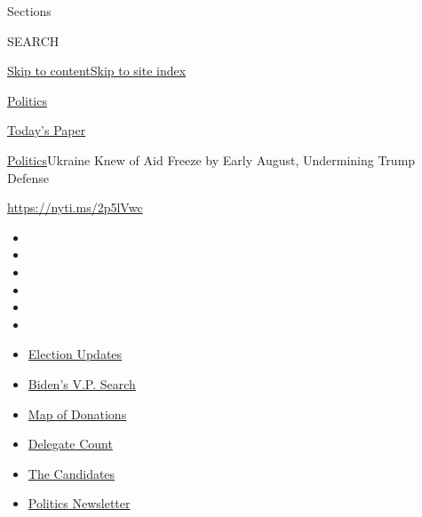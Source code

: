 Sections

SEARCH

\protect\hyperlink{site-content}{Skip to
content}\protect\hyperlink{site-index}{Skip to site index}

\href{https://www.nytimes.com/section/politics}{Politics}

\href{https://myaccount.nytimes.com/auth/login?response_type=cookie\&client_id=vi}{}

\href{https://www.nytimes.com/section/todayspaper}{Today's Paper}

\href{/section/politics}{Politics}\textbar{}Ukraine Knew of Aid Freeze
by Early August, Undermining Trump Defense

\url{https://nyti.ms/2p5lVwc}

\begin{itemize}
\item
\item
\item
\item
\item
\item
\end{itemize}

\begin{itemize}
\item
  \href{https://www.nytimes.com/2020/07/31/us/elections/biden-vs-trump.html?action=click\&pgtype=Article\&state=default\&region=TOP_BANNER\&context=storylines_menu}{Election
  Updates}
\item
  \href{https://www.nytimes.com/article/biden-vice-president-2020.html?action=click\&pgtype=Article\&state=default\&region=TOP_BANNER\&context=storylines_menu}{Biden's
  V.P. Search}
\item
  \href{https://www.nytimes.com/interactive/2020/07/24/us/politics/trump-biden-campaign-donors.html?action=click\&pgtype=Article\&state=default\&region=TOP_BANNER\&context=storylines_menu}{Map
  of Donations}
\item
  \href{https://www.nytimes.com/interactive/2020/us/elections/delegate-count-primary-results.html?action=click\&pgtype=Article\&state=default\&region=TOP_BANNER\&context=storylines_menu}{Delegate
  Count}
\item
  \href{https://www.nytimes.com/interactive/2019/us/politics/2020-presidential-candidates.html?action=click\&pgtype=Article\&state=default\&region=TOP_BANNER\&context=storylines_menu}{The
  Candidates}
\item
  \href{https://www.nytimes.com/newsletters/politics?action=click\&pgtype=Article\&state=default\&region=TOP_BANNER\&context=storylines_menu}{Politics
  Newsletter}
\end{itemize}


